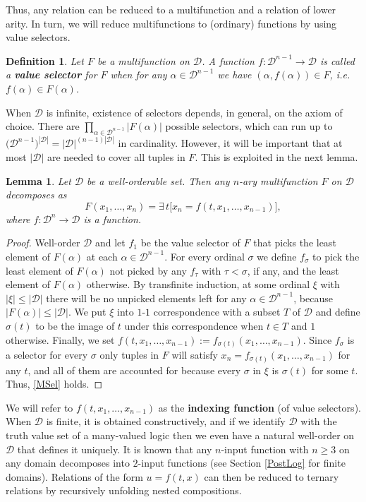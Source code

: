 \documentclass[11pt]{article}
\theoremstyle{plain}
\newtheorem{lemma}{Lemma}
\newtheorem{definition}{Definition}
\theoremstyle{definition}
\def\D{\mathcal{D}}
\def\a{\alpha}
\begin{document}
Thus, any relation can be reduced to a multifunction and a relation of lower arity. In turn, we will reduce multifunctions to (ordinary) functions by using value selectors. 
\begin{definition}\label{Select}
Let $F$ be a multifunction on $\D$. A function $f:\D^{n-1}\to\D$ is called a {\bf value selector} for $F$ when for any $\a\in\D^{n-1}$ we have 
$(\a,f(\a))\in F$, i.e. $f(\a)\in F(\a)$.
\end{definition}
When $\D$ is infinite, existence of selectors depends, in general, on the axiom of choice. There are $\prod_{\a\in\D^{n-1}}|F(\a)|$ possible selectors, which can run up to $\big(\D^{n-1}\big)^{|\D|}=|\D|^{(n-1)|\D|}$ in cardinality. However, it will be important that at most $|\D|$ are needed to cover all tuples in $F$. This is exploited in the next lemma.
\begin{lemma}\label{MultSel} Let $\D$ be a well-orderable set. Then any $n$-ary multifunction $F$ on $\D$ decomposes as
\begin{equation}\label{MSel}
F(x_1,\dots,x_n)=\exists\,t\big[x_n=f(t,x_1,\dots,x_{n-1})\big],
\end{equation}
where $f:\D^{n}\to\D$ is a function.
\end{lemma}
\begin{proof}
Well-order $\D$ and let $f_1$ be the value selector of $F$ that picks the least element of $F(\a)$ at each $\a\in\D^{n-1}$. For every ordinal $\sigma$ we define $f_{\sigma}$ to pick the least element of $F(\a)$ not picked by any $f_{\tau}$ with $\tau<\sigma$, if any, and the least element of $F(\a)$ otherwise. By transfinite induction, at some ordinal $\xi$ with $|\xi|\leq|\D|$ there will be no unpicked elements left for any $\a\in\D^{n-1}$, because $|F(\a)|\leq|\D|$. We put $\xi$ into $1$-$1$ correspondence with a subset $T$ of $\D$ and define $\sigma(t)$ to be the image of $t$ under this correspondence when $t\in T$ and $1$ otherwise. Finally, we set $f(t,x_1,\dots,x_{n-1}):=f_{\sigma(t)}(x_1,\dots,x_{n-1})$. Since $f_{\sigma}$ is a selector for every $\sigma$ only tuples in $F$ will satisfy $x_n=f_{\sigma(t)}(x_1,\dots,x_{n-1})$ for any $t$, and all of them are accounted for because every $\sigma$ in $\xi$ is $\sigma(t)$ for some $t$. Thus, \eqref{MSel} holds.
\end{proof}
We will refer to $f(t,x_1,\dots,x_{n-1})$ as the {\bf indexing function} (of value selectors). When $\D$ is finite, it is obtained constructively, and if we identify $\D$ with the truth value set of a many-valued logic then we even have a natural well-order on $\D$ that defines it uniquely. It is known that any $n$-input function with $n\geq3$ on any domain decomposes into $2$-input functions (see Section \ref{PostLog} for finite domains). Relations of the form $u=f(t,x)$ can then be reduced to ternary relations by recursively unfolding nested compositions. 
\end{document}
